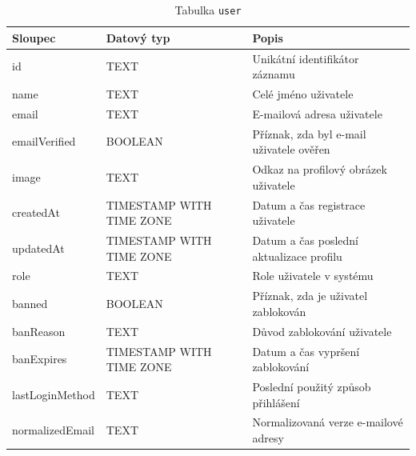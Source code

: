 \begin{table}[ht!]
    \centering
    \begin{tabularx}{\textwidth}{|l|l|L|}
        \hline
        \textbf{Sloupec} & \textbf{Datový typ}      & \textbf{Popis}                           \\ \hline
        id               & TEXT                     & Unikátní identifikátor záznamu           \\ \hline
        name             & TEXT                     & Celé jméno uživatele                     \\ \hline
        email            & TEXT                     & E-mailová adresa uživatele               \\ \hline
        emailVerified    & BOOLEAN                  & Příznak, zda byl e-mail uživatele ověřen \\ \hline
        image            & TEXT                     & Odkaz na profilový obrázek uživatele     \\ \hline
        createdAt        & TIMESTAMP WITH TIME ZONE & Datum a čas registrace uživatele         \\ \hline
        updatedAt        & TIMESTAMP WITH TIME ZONE & Datum a čas poslední aktualizace profilu \\ \hline
        role             & TEXT                     & Role uživatele v systému                 \\ \hline
        banned           & BOOLEAN                  & Příznak, zda je uživatel zablokován      \\ \hline
        banReason        & TEXT                     & Důvod zablokování uživatele              \\ \hline
        banExpires       & TIMESTAMP WITH TIME ZONE & Datum a čas vypršení zablokování         \\ \hline
        lastLoginMethod  & TEXT                     & Poslední použitý způsob přihlášení       \\ \hline
        normalizedEmail  & TEXT                     & Normalizovaná verze e-mailové adresy     \\ \hline
    \end{tabularx}
    \caption{Tabulka \texttt{user}}
    \label{tab:user}
\end{table}
